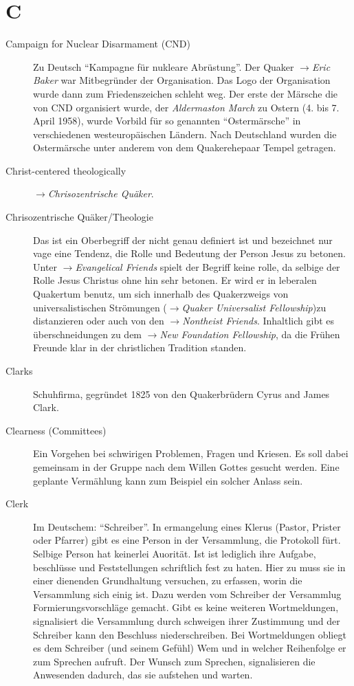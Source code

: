 \section*{C}

\articlesize

\begin{description}


 \item[Campaign for Nuclear Disarmament (CND)] Zu Deutsch ``Kampagne für
nukleare Abrüstung''. Der Quaker $\to$\textit{Eric Baker} war Mitbegründer der
Organisation. Das Logo der Organisation wurde dann zum Friedenszeichen schleht
weg. Der erste der Märsche die von CND organisiert wurde, der
\textit{Aldermaston March} zu Ostern (4. bis 7. April 1958), wurde Vorbild für
so genannten ``Ostermärsche'' in verschiedenen westeuropäischen Ländern. Nach
Deutschland wurden die Ostermärsche unter anderem von dem Quakerehepaar Tempel
getragen.

 \item[Christ-centered theologically] $\to$\textit{Chrisozentrische Quäker}.

 \item[Chrisozentrische Quäker/Theologie] Das ist ein Oberbegriff der nicht genau
definiert ist und bezeichnet nur vage eine Tendenz, die Rolle und Bedeutung der
Person Jesus zu betonen. Unter $\to$\textit{Evangelical Friends} spielt der
Begriff keine rolle, da selbige der Rolle Jesus Christus ohne hin sehr betonen.
Er wird er in leberalen Quakertum benutz, um sich innerhalb des Quakerzweigs von
universalistischen Strömungen ($\to$\textit{Quaker Universalist Fellowship})zu
distanzieren oder auch von den $\to$\textit{Nontheist Friends}. Inhaltlich gibt
es überschneidungen zu dem $\to$\textit{New Foundation Fellowship}, da die
Frühen Freunde klar in der christlichen Tradition standen.

 \item[Clarks] Schuhfirma, gegründet 1825 von den Quakerbrüdern Cyrus and James
Clark.
 
 \item[Clearness (Committees)] Ein Vorgehen bei schwirigen Problemen, Fragen und
Kriesen. Es soll dabei gemeinsam in der Gruppe nach dem Willen Gottes gesucht
werden. Eine geplante Vermählung kann zum Beispiel ein solcher Anlass sein.

 \item[Clerk] Im Deutschem: "`Schreiber"'. In ermangelung eines Klerus (Pastor,
Prister oder Pfarrer) gibt es eine Person in der Versammlung, die Protokoll
fürt. Selbige Person hat keinerlei Auorität. Ist ist lediglich ihre Aufgabe,
beschlüsse und Feststellungen schriftlich fest zu haten. Hier zu muss sie in
einer dienenden Grundhaltung versuchen, zu erfassen, worin die Versammlung sich
einig ist. Dazu werden vom Schreiber der Versammlug Formierungsvorschläge
gemacht. Gibt es keine weiteren Wortmeldungen, signalisiert die Versammlung
durch schweigen ihrer Zustimmung und der Schreiber kann den Beschluss
niederschreiben. Bei Wortmeldungen obliegt es dem Schreiber (und seinem Gefühl)
Wem und in welcher Reihenfolge er zum Sprechen aufruft. Der Wunsch zum Sprechen,
signalisieren die Anwesenden dadurch, das sie aufstehen und warten.


\end{description}
